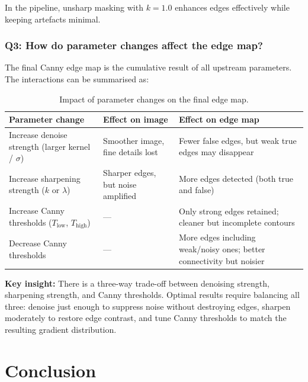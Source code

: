 \documentclass[12pt,a4paper]{article}
\begin{document}
In the pipeline, unsharp masking with $k = 1.0$ enhances edges effectively while keeping artefacts minimal.

\subsubsection{Q3: How do parameter changes affect the edge map?}

The final Canny edge map is the cumulative result of all upstream parameters. The interactions can be summarised as:

\begin{table}[H]
  \centering
  \small
  \begin{tabular}{@{}p{3.8cm}p{5cm}p{5cm}@{}}
    \toprule
    \textbf{Parameter change} & \textbf{Effect on image} & \textbf{Effect on edge map} \\
    \midrule
    Increase denoise strength (larger kernel / $\sigma$) &
      Smoother image, fine details lost &
      Fewer false edges, but weak true edges may disappear \\
    \addlinespace
    Increase sharpening strength ($k$ or $\lambda$) &
      Sharper edges, but noise amplified &
      More edges detected (both true and false) \\
    \addlinespace
    Increase Canny thresholds ($T_\text{low}$, $T_\text{high}$) &
      --- &
      Only strong edges retained; cleaner but incomplete contours \\
    \addlinespace
    Decrease Canny thresholds &
      --- &
      More edges including weak/noisy ones; better connectivity but noisier \\
    \bottomrule
  \end{tabular}
  \caption{Impact of parameter changes on the final edge map.}
  \label{tab:param}
\end{table}

\textbf{Key insight:} There is a three-way trade-off between denoising strength, sharpening strength, and Canny thresholds. Optimal results require balancing all three: denoise just enough to suppress noise without destroying edges, sharpen moderately to restore edge contrast, and tune Canny thresholds to match the resulting gradient distribution.

\section{Conclusion}
\end{document}
